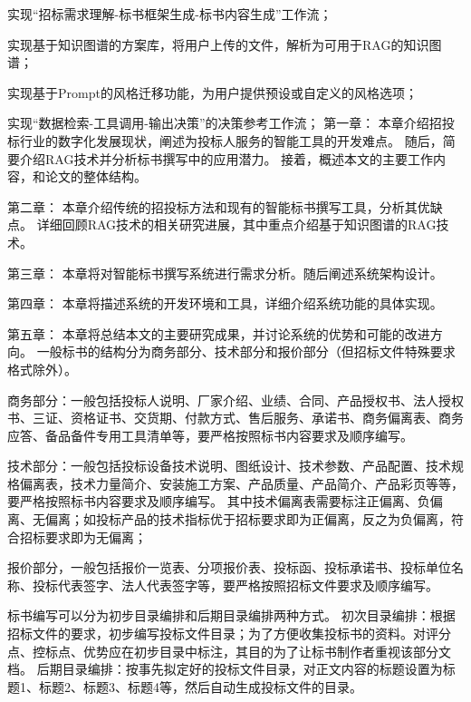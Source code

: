 \documentclass{xmu}
\begin{document}
实现“招标需求理解-标书框架生成-标书内容生成”工作流；

实现基于知识图谱的方案库，将用户上传的文件，解析为可用于RAG的知识图谱；

实现基于Prompt的风格迁移功能，为用户提供预设或自定义的风格选项；

实现“数据检索-工具调用-输出决策”的决策参考工作流；
第一章：
本章介绍招投标行业的数字化发展现状，阐述为投标人服务的智能工具的开发难点。
随后，简要介绍RAG技术并分析标书撰写中的应用潜力。
接着，概述本文的主要工作内容，和论文的整体结构。

第二章：
本章介绍传统的招投标方法和现有的智能标书撰写工具，分析其优缺点。
详细回顾RAG技术的相关研究进展，其中重点介绍基于知识图谱的RAG技术。

第三章：
本章将对智能标书撰写系统进行需求分析。随后阐述系统架构设计。

第四章：
本章将描述系统的开发环境和工具，详细介绍系统功能的具体实现。

第五章：
本章将总结本文的主要研究成果，并讨论系统的优势和可能的改进方向。
一般标书的结构分为商务部分、技术部分和报价部分（但招标文件特殊要求格式除外）。

商务部分：一般包括投标人说明、厂家介绍、业绩、合同、产品授权书、法人授权书、三证、资格证书、交货期、付款方式、售后服务、承诺书、商务偏离表、商务应答、备品备件专用工具清单等，要严格按照标书内容要求及顺序编写。

技术部分：一般包括投标设备技术说明、图纸设计、技术参数、产品配置、技术规格偏离表，技术力量简介、安装施工方案、产品质量、产品简介、产品彩页等等，要严格按照标书内容要求及顺序编写。
其中技术偏离表需要标注正偏离、负偏离、无偏离；如投标产品的技术指标优于招标要求即为正偏离，反之为负偏离，符合招标要求即为无偏离；

报价部分，一般包括报价一览表、分项报价表、投标函、投标承诺书、投标单位名称、投标代表签字、法人代表签字等，要严格按照招标文件要求及顺序编写。

标书编写可以分为初步目录编排和后期目录编排两种方式。
初次目录编排：根据招标文件的要求，初步编写投标文件目录；为了方便收集投标书的资料。对评分点、控标点、优势应在初步目录中标注，其目的为了让标书制作者重视该部分文档。
后期目录编排：按事先拟定好的投标文件目录，对正文内容的标题设置为标题1、标题2、标题3、标题4等，然后自动生成投标文件的目录。
\end{document}
